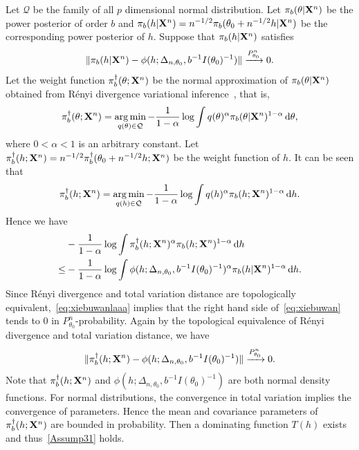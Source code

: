 \documentclass[11pt]{article}
\DeclareMathOperator*{\argmin}{arg\,min}
\theoremstyle{plain}
\theoremstyle{definition}
\theoremstyle{remark}
\begin{document}
Let $\mathcal{Q}$ be the family of all $p$ dimensional normal distribution.
Let $\pi_b (\theta|\mathbf{X}^{n})$ be the power posterior of order $b$ and $\pi_b(h|\mathbf{X}^{n})=n^{-1/2}\pi_b (\theta_0+n^{-1/2}h|\mathbf{X}^{n})$ be the corresponding power posterior of $h$.
Suppose that $\pi_b (h | \mathbf{X}^{n})$ satisfies
\begin{equation}\label{eq:xiebuwanlaaa}
    \|\pi_b (h | \mathbf{X}^{n})-\phi(h;\Delta_{n,\theta_0}, b^{-1} I(\theta_0)^{-1})\| \xrightarrow{P_{\theta_0}^n}0.
\end{equation}
Let the weight function $\pi_b^{\dagger}(\theta;\mathbf{X}^{n})$ be the normal approximation of $\pi_b (\theta|\mathbf{X}^{n})$ obtained from R\'{e}nyi divergence variational inference~\citep{NIPS2016_6208}, that is,
    $$
    \pi_b^{\dagger}(\theta;\BX^{n})=\argmin_{q(\theta)\in\mathcal{Q}} -\frac{1}{1-\alpha} \log \int q(\theta)^{\alpha} \pi_b (\theta|\BX^{n})^{1-\alpha}\, \mathrm d \theta,
    $$
    where $0<\alpha<1$ is an arbitrary constant.
    Let $\pi_b^{\dagger}(h;\mathbf{X}^{n})=n^{-1/2}\pi_b^{\dagger}(\theta_0+n^{-1/2}h;\mathbf{X}^{n})$ be the weight function of $h$.
    It can be seen that
    $$
    \pi_b^{\dagger}(h;\BX^{n})=\argmin_{q(h)\in\mathcal{Q}} -\frac{1}{1-\alpha} \log \int q(h)^{\alpha} \pi_b (h;\BX^{n})^{1-\alpha}\, \mathrm d h.
    $$
    Hence we have
    \begin{equation}\label{eq:xiebuwan}
        \begin{split}
        &-\frac{1}{1-\alpha} \log \int \pi^{\dagger}_b (h;\mathbf{X}^{n})^{\alpha} \pi_b (h;\mathbf{X}^{n})^{1-\alpha}\, \mathrm d h
        \\
    \leq&
    -\frac{1}{1-\alpha} \log \int \phi(h;\Delta_{n,\theta_0}, b^{-1} I(\theta_0)^{-1})^{\alpha} \pi_b (h|\mathbf{X}^{n})^{1-\alpha}\, \mathrm d h.
        \end{split}
    \end{equation}
    Since R\'{e}nyi divergence and total variation distance are topologically equivalent,~\eqref{eq:xiebuwanlaaa} implies that the right hand side of~\eqref{eq:xiebuwan} tends to $0$ in $P_{\theta_0}^n$-probability.
    Again by the topological equivalence of R\'{e}nyi divergence and total variation distance, we have
\begin{equation*}
    \|\pi_b^{\dagger}(h;\mathbf{X}^{n})-\phi(h;\Delta_{n,\theta_0}, b^{-1}I(\theta_0)^{-1})\| \xrightarrow{P_{\theta_0}^n}0.
\end{equation*}
Note that $\pi_b^{\dagger}(h;\mathbf{X}^{n})$ and $\phi(h;\Delta_{n,\theta_0}, b^{-1}I(\theta_0)^{-1})$ are both normal density functions.
For normal distributions, the convergence in total variation implies the convergence of parameters.
Hence the mean and covariance parameters of $\pi_b^{\dagger}(h;\mathbf{X}^{n})$ are bounded in probability.
    Then a dominating function $T(h)$ exists and thus~\eqref{Assump31} holds.
\end{document}

